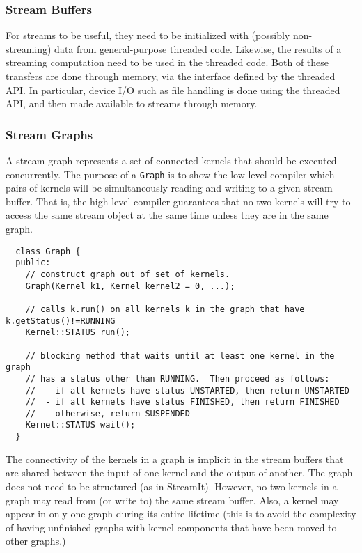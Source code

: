 \subsubsection{Stream Buffers}
\label{sec:procstreams}

For streams to be useful, they need to be initialized with (possibly
non-streaming) data from general-purpose threaded code.  Likewise, the
results of a streaming computation need to be used in the threaded
code.  Both of these transfers are done through memory, via the
interface defined by the threaded API.  In particular, device I/O such
as file handling is done using the threaded API, and then made
available to streams through memory.

\subsubsection{Stream Graphs}
\label{sec:streamgraph}

A stream graph represents a set of connected kernels that should be
executed concurrently.  The purpose of a {\tt Graph} is to show the
low-level compiler which pairs of kernels will be simultaneously
reading and writing to a given stream buffer.  That is, the high-level
compiler guarantees that no two kernels will try to access the same
stream object at the same time unless they are in the same graph.
{\small
\begin{verbatim}
  class Graph {
  public:
    // construct graph out of set of kernels.
    Graph(Kernel k1, Kernel kernel2 = 0, ...);

    // calls k.run() on all kernels k in the graph that have k.getStatus()!=RUNNING
    Kernel::STATUS run();

    // blocking method that waits until at least one kernel in the graph 
    // has a status other than RUNNING.  Then proceed as follows:
    //  - if all kernels have status UNSTARTED, then return UNSTARTED
    //  - if all kernels have status FINISHED, then return FINISHED
    //  - otherwise, return SUSPENDED
    Kernel::STATUS wait();
  }
\end{verbatim}}
\noindent The connectivity of the kernels in a graph is implicit in
the stream buffers that are shared between the input of one kernel and
the output of another.  The graph does not need to be structured (as
in StreamIt).  However, no two kernels in a graph may read from (or
write to) the same stream buffer.  Also, a kernel may appear in only
one graph during its entire lifetime (this is to avoid the complexity
of having unfinished graphs with kernel components that have been
moved to other graphs.)

